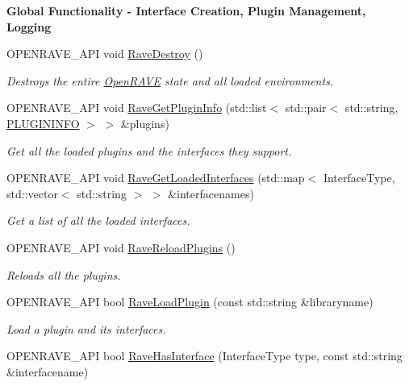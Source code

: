 \begin{Indent}{\bf Global Functionality -\/ Interface Creation, Plugin Management, Logging}
\begin{DoxyCompactItemize}
OPENRAVE\_\-API void \hyperlink{namespaceOpenRAVE_abfafe0fbe621c9be55912937f08104df}{RaveDestroy} ()
\begin{DoxyCompactList}\small\item\em Destroys the entire \hyperlink{namespaceOpenRAVE}{OpenRAVE} state and all loaded environments. \item\end{DoxyCompactList}\item 
OPENRAVE\_\-API void \hyperlink{namespaceOpenRAVE_a9a5cb560a6ba4ba32d431e1d953dd974}{RaveGetPluginInfo} (std::list$<$ std::pair$<$ std::string, \hyperlink{classOpenRAVE_1_1PLUGININFO}{PLUGININFO} $>$ $>$ \&plugins)
\begin{DoxyCompactList}\small\item\em Get all the loaded plugins and the interfaces they support. \item\end{DoxyCompactList}\item 
\hypertarget{namespaceOpenRAVE_a49664d959f0c1345db93849bd78af4db}{
OPENRAVE\_\-API void \hyperlink{namespaceOpenRAVE_a49664d959f0c1345db93849bd78af4db}{RaveGetLoadedInterfaces} (std::map$<$ InterfaceType, std::vector$<$ std::string $>$ $>$ \&interfacenames)}
\label{namespaceOpenRAVE_a49664d959f0c1345db93849bd78af4db}

\begin{DoxyCompactList}\small\item\em Get a list of all the loaded interfaces. \item\end{DoxyCompactList}\item 
OPENRAVE\_\-API void \hyperlink{namespaceOpenRAVE_a4fd5cea1bb7d822e6acc89625c59c5f2}{RaveReloadPlugins} ()
\begin{DoxyCompactList}\small\item\em Reloads all the plugins. \item\end{DoxyCompactList}\item 
OPENRAVE\_\-API bool \hyperlink{namespaceOpenRAVE_a6bca7a284a46924c61bcbdd37aeb3dcf}{RaveLoadPlugin} (const std::string \&libraryname)
\begin{DoxyCompactList}\small\item\em Load a plugin and its interfaces. \item\end{DoxyCompactList}\item 
\hypertarget{namespaceOpenRAVE_ad05e33a91e8613cb74544e0fa933deb6}{
OPENRAVE\_\-API bool \hyperlink{namespaceOpenRAVE_ad05e33a91e8613cb74544e0fa933deb6}{RaveHasInterface} (InterfaceType type, const std::string \&interfacename)}
\label{namespaceOpenRAVE_ad05e33a91e8613cb74544e0fa933deb6}


\end{DoxyCompactItemize}
\end{Indent}
